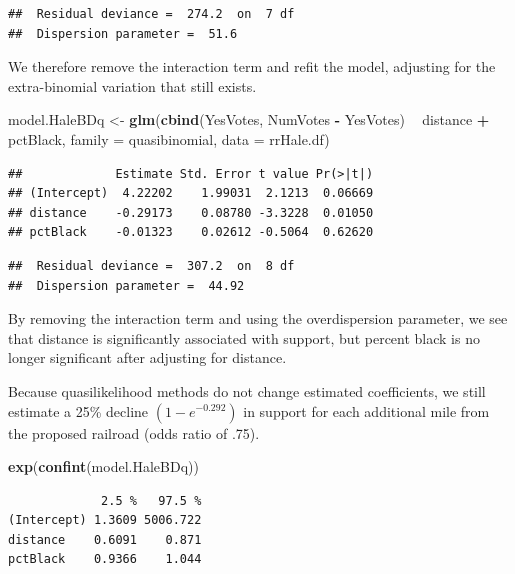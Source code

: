 \documentclass[
]{krantz}
\newenvironment{Shaded}{\begin{snugshade}}{\end{snugshade}}
\newcommand{\DataTypeTok}[1]{\textcolor[rgb]{0.27,0.27,0.27}{#1}}
\newcommand{\KeywordTok}[1]{\textcolor[rgb]{0.27,0.27,0.27}{\textbf{#1}}}
\newcommand{\NormalTok}[1]{#1}
\newcommand{\OperatorTok}[1]{\textcolor[rgb]{0.43,0.43,0.43}{\textbf{#1}}}
\newcommand{\StringTok}[1]{\textcolor[rgb]{0.5,0.5,0.5}{#1}}
\begin{document}
\begin{verbatim}
##  Residual deviance =  274.2  on  7 df 
##  Dispersion parameter =  51.6
\end{verbatim}

We therefore remove the interaction term and refit the model, adjusting for the extra-binomial variation that still exists.

\begin{Shaded}
\begin{Highlighting}[]
\NormalTok{model.HaleBDq <-}\StringTok{ }\KeywordTok{glm}\NormalTok{(}\KeywordTok{cbind}\NormalTok{(YesVotes, NumVotes }\OperatorTok{-}\StringTok{ }\NormalTok{YesVotes) }\OperatorTok{~}
\StringTok{  }\NormalTok{distance }\OperatorTok{+}\StringTok{ }\NormalTok{pctBlack, }
  \DataTypeTok{family =}\NormalTok{ quasibinomial, }\DataTypeTok{data =}\NormalTok{ rrHale.df)}
\end{Highlighting}
\end{Shaded}

\begin{verbatim}
##             Estimate Std. Error t value Pr(>|t|)
## (Intercept)  4.22202    1.99031  2.1213  0.06669
## distance    -0.29173    0.08780 -3.3228  0.01050
## pctBlack    -0.01323    0.02612 -0.5064  0.62620
\end{verbatim}

\begin{verbatim}
##  Residual deviance =  307.2  on  8 df 
##  Dispersion parameter =  44.92
\end{verbatim}

By removing the interaction term and using the overdispersion parameter, we see that distance is significantly associated with support, but percent black is no longer significant after adjusting for distance.

Because quasilikelihood methods do not change estimated coefficients, we still estimate a 25\% decline \((1-e^{-0.292})\) in support for each additional mile from the proposed railroad (odds ratio of .75).

\begin{Shaded}
\begin{Highlighting}[]
\KeywordTok{exp}\NormalTok{(}\KeywordTok{confint}\NormalTok{(model.HaleBDq))}
\end{Highlighting}
\end{Shaded}

\begin{verbatim}
             2.5 %   97.5 %
(Intercept) 1.3609 5006.722
distance    0.6091    0.871
pctBlack    0.9366    1.044
\end{verbatim}
\end{document}
